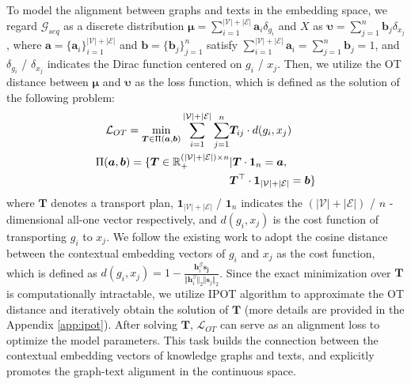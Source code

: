 \documentclass[11pt,a4paper]{article}
\begin{document}
To model the alignment between graphs and texts in the embedding space, we regard $\mathcal{G}_{seq}$ as a discrete distribution $\bm{\mu}=\sum_{i=1}^{|\mathcal{V}|+|\mathcal{E}|}\bm{a}_i\delta_{g_i}$ and $X$ as $\bm{\upsilon}=\sum_{j=1}^n \bm{b}_j\delta_{x_j}$,
where $\bm{a}=\{\bm{a}_i\}_{i=1}^{|\mathcal{V}|+|\mathcal{E}|}$ and $\bm{b}=\{\bm{b}_j\}_{j=1}^n$ satisfy $\sum_{i=1}^{|\mathcal{V}|+|\mathcal{E}|}\bm{a}_i=\sum_{j=1}^{n}\bm{b}_j=1$, and $\delta_{g_i}$ / $\delta_{x_j}$ indicates the Dirac function centered on $g_i$ / $x_j$. Then, we utilize the OT distance between $\bm{\mu}$ and $\bm{\upsilon}$ as the loss function, which is defined as the solution of the following problem:
\begin{align}
    \mathcal{L}_{OT} = \min_{\bm{T}\in \Pi(\bm{a},\bm{b})} \sum_{i=1}^{|\mathcal{V}|+|\mathcal{E}|} \sum_{j=1}^n & \bm{T}_{ij}\cdot d(g_i,x_j) \\
    \Pi(\bm{a},\bm{b}) =\{\bm{T}\in \mathbb{R}_{+}^{(|\mathcal{V}|+|\mathcal{E}|) \times n} &| \bm{T}\cdot\bm{1}_{n}=\bm{a}, \notag \\
    & \bm{T}^\top\cdot\bm{1}_{|\mathcal{V}|+|\mathcal{E}|}=\bm{b}\} \notag
\end{align}
where $\bm{T}$ denotes a transport plan, $\bm{1}_{|\mathcal{V}|+|\mathcal{E}|}$ / $\bm{1}_{n}$ indicates the $(|\mathcal{V}|+|\mathcal{E}|)$ / $n$ -dimensional all-one vector respectively, and $d(g_i,x_j)$ is the cost function of transporting $g_i$ to $x_j$. We follow the existing work \cite{chen2020uniter} to adopt the cosine distance between the contextual embedding vectors of $g_i$ and $x_j$ as the cost function, which is defined as $d(g_i,x_j)=1-\frac{\bm{h}_i^\mathcal{G}\bm{s_j}}{\Vert \bm{h}_i^\mathcal{G}\Vert_2 \Vert\bm{s}_j\Vert_2}$.
Since the exact minimization over $\bm{T}$ is computationally intractable, we utilize IPOT algorithm \cite{xie2019ipot} to approximate the OT distance and iteratively obtain the solution of $\bm{T}$ (more details are provided in the Appendix \ref{app:ipot}). After solving $\bm{T}$, $\mathcal{L}_{OT}$ can serve as an alignment loss to optimize the model parameters. This task builds the connection between the contextual embedding vectors of knowledge graphs and texts, and explicitly promotes the graph-text alignment in the continuous space.
\end{document}
